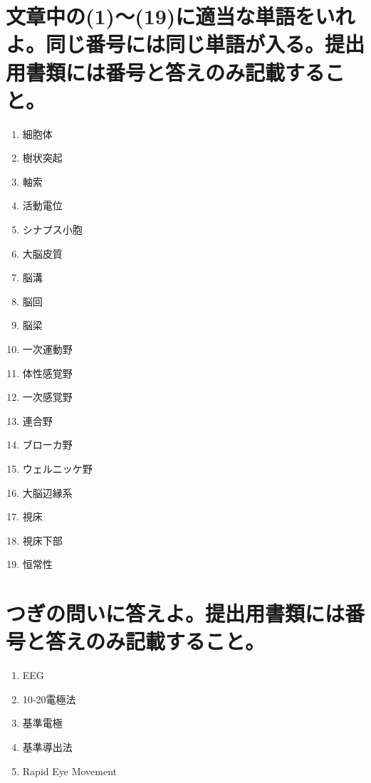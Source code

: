 \documentclass[titlepage,a4paper]{jsarticle}
\begin{document}
\section{文章中の(1)〜(19)に適当な単語をいれよ。同じ番号には同じ単語が入る。提出用書類には番号と答えのみ記載すること。}%
\begin{enumerate}
      \item 細胞体
      \item 樹状突起
      \item 軸索
      \item 活動電位
      \item シナプス小胞
      \item 大脳皮質
      \item 脳溝
      \item 脳回
      \item 脳梁
      \item 一次運動野
      \item 体性感覚野
      \item 一次感覚野
      \item 連合野
      \item ブローカ野
      \item ウェルニッケ野
      \item 大脳辺縁系
      \item 視床
      \item 視床下部
      \item 恒常性
\end{enumerate}
\section{つぎの問いに答えよ。提出用書類には番号と答えのみ記載すること。}%
\begin{enumerate}
      \item EEG
      \item 10-20電極法
      \item 基準電極
      \item 基準導出法
      \item Rapid Eye Movement
\end{enumerate}
\end{document}
